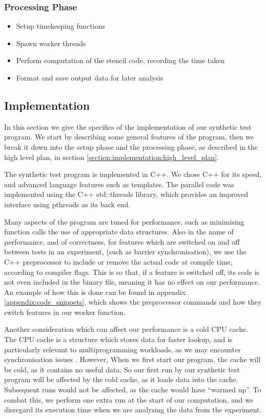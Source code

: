 \subsubsection{Processing Phase}
\label{section:implementation:procesing_phase}

\begin{itemize}
    \item Setup timekeeping functions
    \item Spawn worker threads
    \item Perform computation of the stencil code, recording the time taken
    \item Format and save output data for later analysis
\end{itemize}



\subsection{Implementation}
\label{section:implementation:implementation}

In this section we give the specifics of the implementation of our synthetic test program. We start by describing some general features of the program, then we break it down into the setup phase and the processing phase, as described in the high level plan, in section \ref{section:implementation:high_level_plan}.

The synthetic test program is implemented in C++. We chose C++ for its speed, and advanced language features such as templates. The parallel code was implemented using the C++ std::threads library, which provides an improved interface using pthreads as its back end.

Many aspects of the program are tuned for performance, such as minimising function calls the use of appropriate data structures. Also in the name of performance, and of correctness, for features which are switched on and off between tests in an experiment, (such as barrier synchronisation), we use the C++ preprocessor to include or remove the actual code at compile time, according to compiler flags. This is so that, if a feature is switched off, its code is not even included in the binary file, meaning it has no effect on our performance. An example of how this is done can be found in appendix \ref{appendix:code_snippets}, which shows the preprocessor commands and how they switch features in our worker function.

Another consideration which can affect our performance is a cold CPU cache. The CPU cache is a structure which stores data for faster lookup, and is particularly relevant to multiprogramming workloads, as we may encounter synchronisation issues \cite{agarwal_hennessy_horowitz_1988}. However, When we first start our program, the cache will be cold, as it contains no useful data. So our first run by our synthetic test program will be affected by the cold cache, as it loads data into the cache. Subsequent runs would not be affected, as the cache would have ``warmed up''. To combat this, we perform one extra run at the start of our computation, and we disregard its execution time when we are analysing the data from the experiment.



